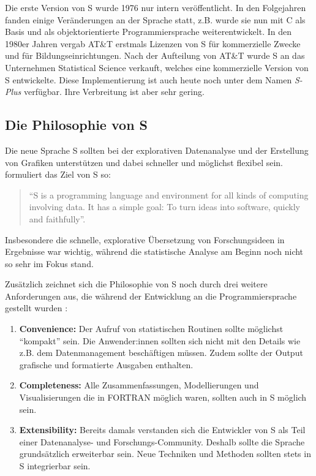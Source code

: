 \documentclass[
]{book}
\begin{document}
Die erste Version von S wurde 1976 nur intern veröffentlicht. In den Folgejahren fanden einige
Veränderungen an der Sprache statt, z.B. wurde sie nun mit C als Basis und als objektorientierte
Programmiersprache weiterentwickelt. In den 1980er Jahren vergab AT\&T erstmals Lizenzen von S für
kommerzielle Zwecke und für Bildungseinrichtungen.
Nach der Aufteilung von AT\&T wurde S an das Unternehmen Statistical Science verkauft, welches eine kommerzielle Version von S entwickelte.
Diese Implementierung ist auch heute noch unter dem Namen \emph{S-Plus} verfügbar.
Ihre Verbreitung ist aber sehr gering.

\hypertarget{die-philosophie-von-s}{%
\subsection{Die Philosophie von S}\label{die-philosophie-von-s}}

Die neue Sprache S sollten bei der explorativen Datenanalyse und der Erstellung von Grafiken unterstützen
und dabei schneller und möglichst flexibel sein.
\citet{Chambers_2000} formuliert das Ziel von S so:

\begin{quote}
``S is a programming language and environment for all kinds of computing involving data. It has a simple goal: To turn ideas into software, quickly and faithfully''.
\end{quote}

Insbesondere die schnelle, explorative Übersetzung von Forschungsideen in Ergebnisse war wichtig, während die statistische Analyse am Beginn noch nicht so sehr im Fokus stand.

Zusätzlich zeichnet sich die Philosophie von S noch durch drei weitere Anforderungen aus, die
während der Entwicklung an die Programmiersprache gestellt wurden \citep[S. 84:5]{Chambers_2020}:

\begin{enumerate}
\def\labelenumi{\arabic{enumi}.}
\item
  \textbf{Convenience:} Der Aufruf von statistischen Routinen sollte möglichst ``kompakt'' sein. Die Anwender:innen sollten sich nicht mit den Details wie z.B. dem Datenmanagement beschäftigen müssen. Zudem sollte der Output grafische und formatierte Ausgaben enthalten.
\item
  \textbf{Completeness:} Alle Zusammenfassungen, Modellierungen und Visualisierungen die in FORTRAN möglich waren, sollten auch in S möglich sein.
\item
  \textbf{Extensibility:} Bereits damals verstanden sich die Entwickler von S als Teil einer Datenanalyse- und
  Forschungs-Community.
  Deshalb sollte die Sprache grundsätzlich erweiterbar sein. Neue Techniken und Methoden sollten stets in S integrierbar sein.
\end{enumerate}
\end{document}
